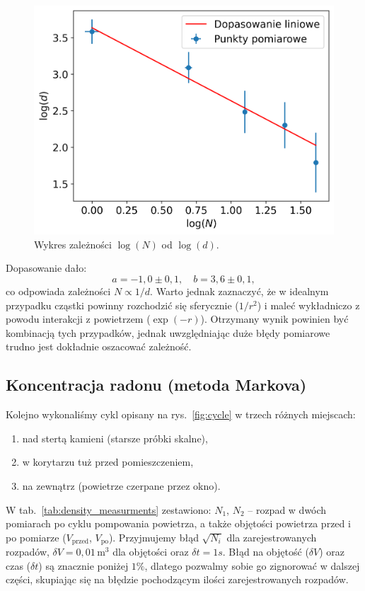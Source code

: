 \documentclass[12pt]{article}
\begin{document}
\begin{figure}[H]
	\centering
	\includegraphics[scale=0.7]{distance_log}
	\caption{Wykres zależności $\log(N)$ od $\log(d)$.}
	\label{fig:distance_log}
\end{figure}

Dopasowanie dało:
\[
	a = -1{,}0 \pm 0{,}1, 
	\quad
	b = 3{,}6 \pm 0{,}1,
\]
co odpowiada zależności \(N \propto 1/d\). Warto jednak zaznaczyć, że w idealnym przypadku cząstki powinny rozchodzić się sferycznie (\(1/r^2\)) i maleć wykładniczo z powodu interakcji z powietrzem (\(\exp(-r)\)). Otrzymany wynik powinien być kombinacją tych przypadków, jednak uwzględniając duże błędy pomiarowe trudno jest dokładnie oszacować zależność.

\subsection{Koncentracja radonu (metoda Markova)}
Kolejno wykonaliśmy cykl opisany na rys.~\ref{fig:cycle} w trzech różnych miejscach: 
\begin{enumerate}[noitemsep]
	\item nad stertą kamieni (starsze próbki skalne),  
	\item w korytarzu tuż przed pomieszczeniem,  
	\item na zewnątrz (powietrze czerpane przez okno).
\end{enumerate}

W tab.~\ref{tab:density_measurments} zestawiono: $N_1$, $N_2$ – rozpad w dwóch pomiarach po cyklu pompowania powietrza, a także objętości powietrza przed i po pomiarze (\(V_{\text{przed}}\), \(V_{\text{po}}\)). Przyjmujemy błąd \(\sqrt{N_i}\) dla zarejestrowanych rozpadów, \(\delta V=0{,}01\,\mathrm{m^3}\) dla objętości oraz \(\delta t = 1s\).
Błąd na objętość (\(\delta V\)) oraz czas (\(\delta t\)) są znacznie poniżej \(1\%\), dlatego pozwalmy sobie go zignorować w dalszej części, skupiając się na błędzie pochodzącym ilości zarejestrowanych rozpadów.
\end{document}
